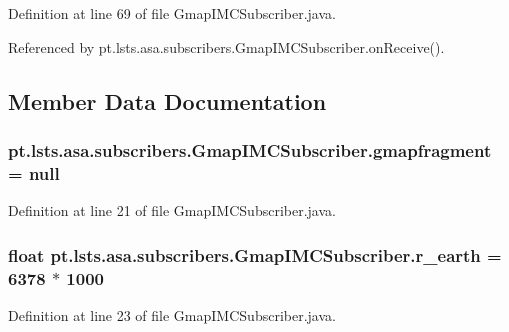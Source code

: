 Definition at line 69 of file Gmap\+I\+M\+C\+Subscriber.\+java.



Referenced by pt.\+lsts.\+asa.\+subscribers.\+Gmap\+I\+M\+C\+Subscriber.\+on\+Receive().



\subsection{Member Data Documentation}
\hypertarget{classpt_1_1lsts_1_1asa_1_1subscribers_1_1GmapIMCSubscriber_a2d4bc80f27aac786b6844b87e412eb6d}{}
\subsubsection[{gmapfragment}]{ pt.\+lsts.\+asa.\+subscribers.\+Gmap\+I\+M\+C\+Subscriber.\+gmapfragment = null\hspace{0.3cm}{\ttfamily [private]}}\label{classpt_1_1lsts_1_1asa_1_1subscribers_1_1GmapIMCSubscriber_a2d4bc80f27aac786b6844b87e412eb6d}


Definition at line 21 of file Gmap\+I\+M\+C\+Subscriber.\+java.

\hypertarget{classpt_1_1lsts_1_1asa_1_1subscribers_1_1GmapIMCSubscriber_a1634fd9119d38ae52377687fe3ac186d}{}
\subsubsection[{r\+\_\+earth}]{\setlength{\rightskip}{0pt plus 5cm}float pt.\+lsts.\+asa.\+subscribers.\+Gmap\+I\+M\+C\+Subscriber.\+r\+\_\+earth = 6378 $\ast$ 1000\hspace{0.3cm}{\ttfamily [private]}}\label{classpt_1_1lsts_1_1asa_1_1subscribers_1_1GmapIMCSubscriber_a1634fd9119d38ae52377687fe3ac186d}


Definition at line 23 of file Gmap\+I\+M\+C\+Subscriber.\+java.

